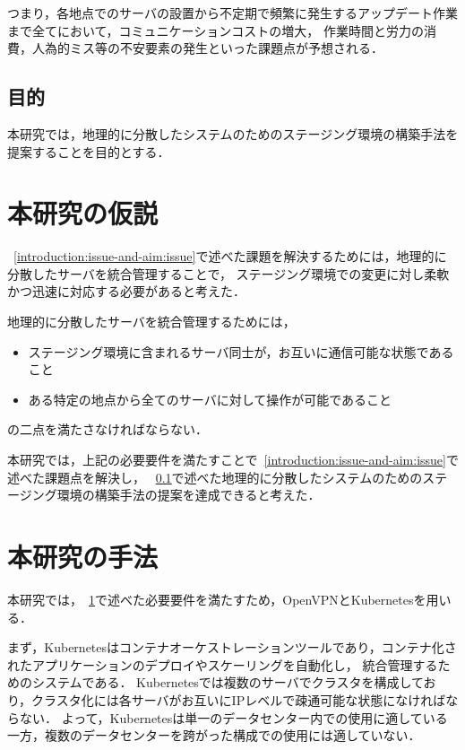 つまり，各地点でのサーバの設置から不定期で頻繁に発生するアップデート作業まで全てにおいて，コミュニケーションコストの増大，
作業時間と労力の消費，人為的ミス等の不安要素の発生といった課題点が予想される．

\subsection{目的}
\label{introduction:issue-and-aim:aim}

本研究では，地理的に分散したシステムのためのステージング環境の構築手法を提案することを目的とする．

\section{本研究の仮説}
\label{introduction:hypothesis}

~\ref{introduction:issue-and-aim:issue}で述べた課題を解決するためには，地理的に分散したサーバを統合管理することで，
ステージング環境での変更に対し柔軟かつ迅速に対応する必要があると考えた．

地理的に分散したサーバを統合管理するためには，
\begin{itemize}
  \item ステージング環境に含まれるサーバ同士が，お互いに通信可能な状態であること
  \item ある特定の地点から全てのサーバに対して操作が可能であること
\end{itemize}
の二点を満たさなければならない．

本研究では，上記の必要要件を満たすことで~\ref{introduction:issue-and-aim:issue}で述べた課題点を解決し，
~\ref{introduction:issue-and-aim:aim}で述べた地理的に分散したシステムのためのステージング環境の構築手法の提案を達成できると考えた．

\section{本研究の手法}
\label{introduction:proposal}

本研究では，~\ref{introduction:hypothesis}で述べた必要要件を満たすため，OpenVPNとKubernetesを用いる．

まず，Kubernetesはコンテナオーケストレーションツールであり，コンテナ化されたアプリケーションのデプロイやスケーリングを自動化し，
統合管理するためのシステムである．
Kubernetesでは複数のサーバでクラスタを構成しており，クラスタ化には各サーバがお互いにIPレベルで疎通可能な状態になければならない．
よって，Kubernetesは単一のデータセンター内での使用に適している一方，複数のデータセンターを跨がった構成での使用には適していない．

